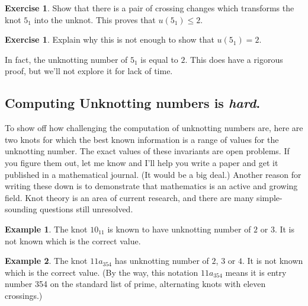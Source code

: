 \documentclass[12pt,letterpaper]{article}
\theoremstyle{definition}
\newtheorem{example}{Example}
\newtheorem{exercise}[question]{Exercise}
\begin{document}
\begin{exercise}
Show that there is a pair of crossing changes which transforms the knot $5_1$ into the unknot.
This proves that $u(5_1) \leq 2$.
\end{exercise}

\begin{exercise}
Explain why this is not enough to show that $u(5_1) = 2$.
\end{exercise}

In fact, the unknotting number of $5_1$ is equal to $2$. This does have a rigorous proof, but we'll not explore it for lack of time.

\subsection*{Computing Unknotting numbers is \emph{hard}.}

To show off how challenging the computation of unknotting numbers are, here are two knots for which the best known information is a range of values for the unknotting number. 
The exact values of these invariants are open problems. 
If you figure them out, let me know and I'll help you write a paper and get it published in a mathematical journal. 
(It would be a big deal.)
Another reason for writing these down is to demonstrate that mathematics is an active and growing field. Knot theory is an area of current research, and there are many simple-sounding questions still unresolved.

\begin{example}
The knot $10_{11}$ is known to have unknotting number of $2$ or $3$.
It is not known which is the correct value.
\end{example}

\begin{example}
The knot $11a_{354}$ has unknotting number of $2$, $3$ or $4$.
It is not known which is the correct value.
(By the way, this notation $11a_{354}$ means it is entry number 354 on the standard list of prime, alternating knots with eleven crossings.)
\end{example}
\end{document}
